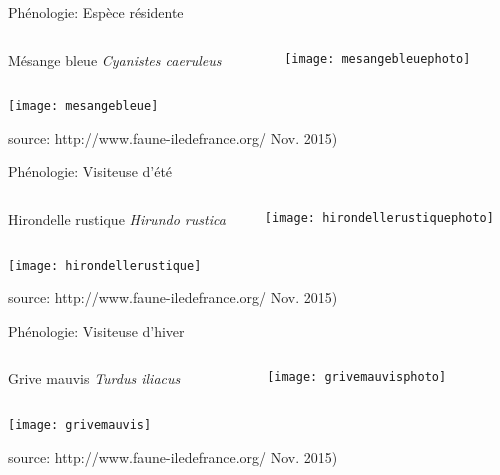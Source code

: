 \documentclass[10pt]{beamer}
\begin{document}
\begin{frame}{Phénologie: Espèce résidente}
 \begin{columns}
    \begin{column}[c]{0.7\textwidth}
   Mésange bleue \textit{Cyanistes caeruleus}
    \end{column}
    \begin{column}[c]{0.30\textwidth}
     \begin{center}
        \texttt{[image: mesangebleuephoto]}
  \end{center}
    \end{column}
  \end{columns}
    \begin{center}
        \texttt{[image: mesangebleue]}
  \end{center}
  \footnotesize{source: http://www.faune-iledefrance.org/ Nov. 2015)}
\end{frame}

\begin{frame}{Phénologie: Visiteuse d'été}
 \begin{columns}
    \begin{column}[c]{0.7\textwidth}
   Hirondelle rustique \textit{Hirundo rustica}
    \end{column}
    \begin{column}[c]{0.30\textwidth}
     \begin{center}
        \texttt{[image: hirondellerustiquephoto]}
  \end{center}
    \end{column}
  \end{columns}
    \begin{center}
        \texttt{[image: hirondellerustique]}
  \end{center}
  \footnotesize{source: http://www.faune-iledefrance.org/ Nov. 2015)}
\end{frame}


\begin{frame}{Phénologie: Visiteuse d'hiver}
 \begin{columns}
    \begin{column}[c]{0.7\textwidth}
   Grive mauvis \textit{Turdus iliacus}
    \end{column}
    \begin{column}[c]{0.30\textwidth}
     \begin{center}
        \texttt{[image: grivemauvisphoto]}
  \end{center}
    \end{column}
  \end{columns}
    \begin{center}
        \texttt{[image: grivemauvis]}
  \end{center}
  \footnotesize{source: http://www.faune-iledefrance.org/ Nov. 2015)}
\end{frame}
\end{document}
